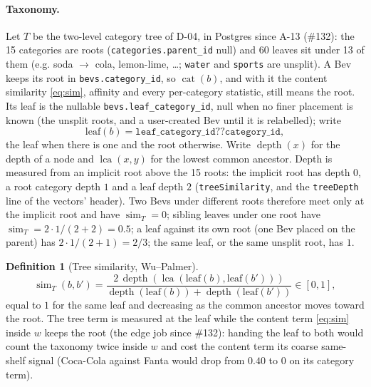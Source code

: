 \documentclass[11pt]{article}
\DeclareMathOperator{\simi}{sim}
\DeclareMathOperator{\cat}{cat}
\DeclareMathOperator{\lca}{lca}
\DeclareMathOperator{\depth}{depth}
\newcommand{\code}[1]{\texttt{#1}}
\theoremstyle{plain}
\theoremstyle{definition}
\newtheorem{definition}[theorem]{Definition}
\theoremstyle{remark}
\begin{document}
\paragraph{Taxonomy.} Let $T$ be the two-level category tree of D-04, in Postgres since A-13 (\#132): the 15 categories are roots (\code{categories.parent\_id} null) and 60 leaves sit under 13 of them (e.g. soda $\to$ cola, lemon-lime, \dots; \code{water} and \code{sports} are unsplit). A Bev keeps its root in \code{bevs.category\_id}, so $\cat(b)$, and with it the content similarity \eqref{eq:sim}, affinity and every per-category statistic, still means the root. Its leaf is the nullable \code{bevs.leaf\_category\_id}, null when no finer placement is known (the unsplit roots, and a user-created Bev until it is relabelled); write
\[
\mathrm{leaf}(b) = \code{leaf\_category\_id} \mathbin{??} \code{category\_id},
\]
the leaf when there is one and the root otherwise. Write $\depth(x)$ for the depth of a node and $\lca(x, y)$ for the lowest common ancestor. Depth is measured from an implicit root above the 15 roots: the implicit root has depth $0$, a root category depth $1$ and a leaf depth $2$ (\code{treeSimilarity}, and the \code{treeDepth} line of the vectors' header). Two Bevs under different roots therefore meet only at the implicit root and have $\simi_T = 0$; sibling leaves under one root have $\simi_T = 2 \cdot 1/(2 + 2) = 0.5$; a leaf against its own root (one Bev placed on the parent) has $2 \cdot 1/(2 + 1) = 2/3$; the same leaf, or the same unsplit root, has $1$.

\begin{definition}[Tree similarity, Wu--Palmer]
\begin{equation}\label{eq:wp}
\simi_T(b, b') = \frac{2\,\depth(\lca(\mathrm{leaf}(b), \mathrm{leaf}(b')))}{\depth(\mathrm{leaf}(b)) + \depth(\mathrm{leaf}(b'))} \in [0, 1],
\end{equation}
equal to $1$ for the same leaf and decreasing as the common ancestor moves toward the root. The tree term is measured at the leaf while the content term \eqref{eq:sim} inside $w$ keeps the root (the edge job since \#132): handing the leaf to both would count the taxonomy twice inside $w$ and cost the content term its coarse same-shelf signal (Coca-Cola against Fanta would drop from $0.40$ to $0$ on its category term).
\end{definition}
\end{document}
